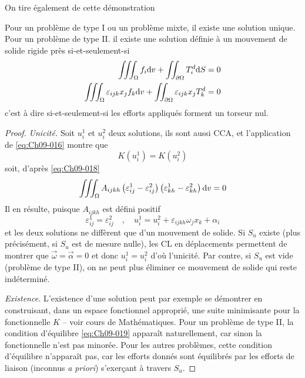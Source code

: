 On tire également de cette démonstration 
\begin{thm}
    Pour un problème de type I ou un problème mixte, il existe une solution unique.
    Pour un problème de type II. il existe une solution définie à un mouvement de solide rigide près si-et-seulement-si
    \begin{equation}
        \begin{split}
            \iiint_{\Omega} f_i \mathrm{d} v + \iint_{\partial \Omega} T_i^d \mathrm{d} S = 0 \\
            \iiint_{\Omega} \varepsilon_{ijk} x_{j} f_k \mathrm{d} v + \iint_{\partial \Omega} \varepsilon_{ijk} x_j T_k^d = 0
        \end{split}
        \label{eq:Ch09-019}
    \end{equation}
    c'est à dire si-et-seulement-si les efforts appliqués forment un torseur nul. 
\end{thm}
\begin{proof}
    \textit{Unicité.}
    Soit $u_i^1$ et $u_i^2$ deux solutions, ils sont aussi CCA, et l'application de \eqref{eq:Ch09-016} montre que 
    \begin{displaymath}
        K\left( u_i^1 \right) = K \left( u_i^2 \right)
    \end{displaymath}
    soit, d'après \eqref{eq:Ch09-018}
    \begin{eqnarray}
        \iiint_{\Omega} A_{ijkh} \left( \varepsilon_{ij}^1 - \varepsilon_{ij}^2 \right) \left( \varepsilon_{kh}^1 - \varepsilon_{kh}^2 \right) \mathrm{d} v = 0
        \label{eq:Ch09-020}
    \end{eqnarray}
    Il en résulte, puisque $A_{ijkh}$ est défini positif 
    \begin{equation}
        \varepsilon_{ij}^1 = \varepsilon_{ij}^2 \quad,\quad u_i^1 = u_i^2 + \varepsilon_{ijkh} \omega_j x_k + \alpha_i
        \label{eq:Ch09-021}
    \end{equation}
    et les deux solutions ne diffèrent que d'un mouvement de solide.
    Si $S_u$ existe (plus précisément, si $S_u$ est de mesure nulle), les CL en déplacements permettent de montrer que $\vec{\omega} = \vec{\alpha} = 0$ 
et donc $u_i^1 = u_i^2$ d'où l'unicité. 
    Par contre, si $S_u$ est vide (problème de type II), on ne peut plus éliminer ce mouvement de solide qui reste indéterminé.

    \textit{Existence.}
    L'existence d'une solution peut par exemple se démontrer en construisant, dans un espace fonctionnel approprié, une suite minimisante pour la fonctionnelle $K$ -- voir cours de Mathématiques.
    Pour un problème de type II, la condition d'équilibre \eqref{eq:Ch09-019} apparaît naturellement, car sinon la fonctionnelle n'est pas minorée. 
    Pour les autres problèmes, cette condition d'équilibre n'apparaît pas, car les efforts donnés sont équilibrés par les efforts de liaison (inconnus \textit{a priori}) s'exerçant à travers $S_u$.
\end{proof}

